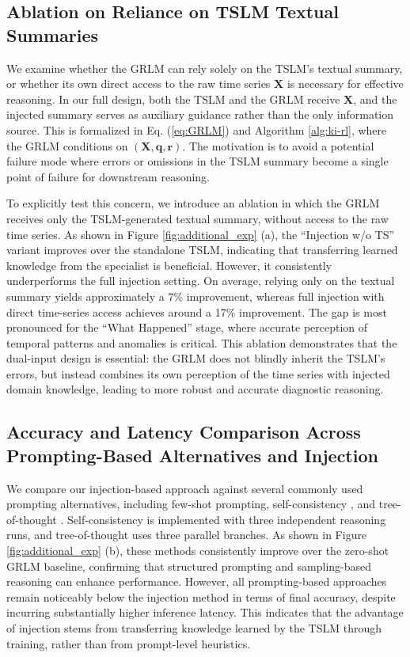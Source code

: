 \documentclass[twoside]{article}
\begin{document}
\subsection{Ablation on Reliance on TSLM Textual Summaries}
\label{app:ablation_tslm_summary}
We examine whether the GRLM can rely solely on the TSLM’s textual summary, or whether its own direct access to the raw time series $\mathbf{X}$ is necessary for effective reasoning. In our full design, both the TSLM and the GRLM receive $\mathbf{X}$, and the injected summary serves as auxiliary guidance rather than the only information source. This is formalized in Eq. (\ref{eq:GRLM}) and Algorithm \ref{alg:ki-rl}, where the GRLM conditions on $(\mathbf{X}, \mathbf{q}, \mathbf{r})$. The motivation is to avoid a potential failure mode where errors or omissions in the TSLM summary become a single point of failure for downstream reasoning.

To explicitly test this concern, we introduce an ablation in which the GRLM receives only the TSLM-generated textual summary, without access to the raw time series. As shown in Figure \ref{fig:additional_exp} (a), the “Injection w/o TS” variant improves over the standalone TSLM, indicating that transferring learned knowledge from the specialist is beneficial. However, it consistently underperforms the full injection setting. On average, relying only on the textual summary yields approximately a 7\% improvement, whereas full injection with direct time-series access achieves around a 17\% improvement. The gap is most pronounced for the “What Happened” stage, where accurate perception of temporal patterns and anomalies is critical. This ablation demonstrates that the dual-input design is essential: the GRLM does not blindly inherit the TSLM’s errors, but instead combines its own perception of the time series with injected domain knowledge, leading to more robust and accurate diagnostic reasoning.

\subsection{Accuracy and Latency Comparison Across Prompting-Based Alternatives and Injection}
\label{app:accuracy_latency}

We compare our injection-based approach against several commonly used prompting alternatives, including few-shot prompting, self-consistency \citep{wang2022self}, and tree-of-thought \citep{yao2023tree}. Self-consistency is implemented with three independent reasoning runs, and tree-of-thought uses three parallel branches. As shown in Figure \ref{fig:additional_exp} (b), these methods consistently improve over the zero-shot GRLM baseline, confirming that structured prompting and sampling-based reasoning can enhance performance. However, all prompting-based approaches remain noticeably below the injection method in terms of final accuracy, despite incurring substantially higher inference latency. This indicates that the advantage of injection stems from transferring knowledge learned by the TSLM through training, rather than from prompt-level heuristics.
\end{document}
